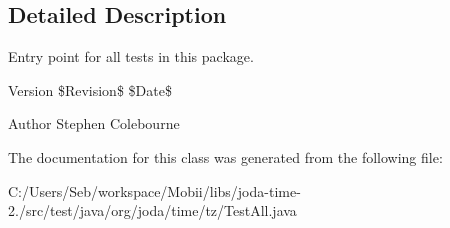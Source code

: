 \subsection{Detailed Description}
Entry point for all tests in this package.

\begin{DoxyVersion}{Version}
\$\-Revision\$ \$\-Date\$
\end{DoxyVersion}
\begin{DoxyAuthor}{Author}
Stephen Colebourne 
\end{DoxyAuthor}


The documentation for this class was generated from the following file\-:\begin{DoxyCompactItemize}
\item 
C\-:/\-Users/\-Seb/workspace/\-Mobii/libs/joda-\/time-\/2./src/test/java/org/joda/time/tz/Test\-All.\-java\end{DoxyCompactItemize}
